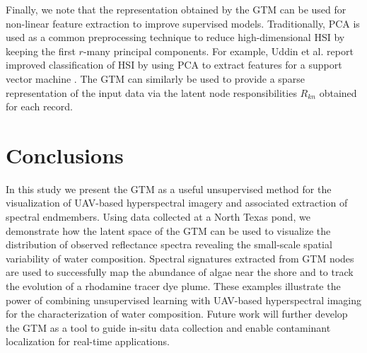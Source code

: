 \documentclass[remotesensing,article,submit,pdftex,moreauthors]{Definitions/mdpi}
\begin{document}
Finally, we note that the representation obtained by the GTM can be used for non-linear feature extraction to improve supervised models. Traditionally, PCA is used as a common preprocessing technique to reduce high-dimensional HSI by keeping the first $r$-many principal components. For example, Uddin et al. report improved classification of HSI by using PCA to extract features for a support vector machine \cite{uddin2021pca}. The GTM can similarly be used to provide a sparse representation of the input data via the latent node responsibilities $R_{kn}$ obtained for each record. 

\section{Conclusions}\label{conclusions}

In this study we present the GTM as a useful unsupervised method for the visualization of UAV-based hyperspectral imagery and associated extraction of spectral endmembers. Using data collected at a North Texas pond, we demonstrate how the latent space of the GTM can be used to visualize the distribution of observed reflectance spectra revealing the small-scale spatial variability of water composition. Spectral signatures extracted from GTM nodes are used to successfully map the abundance of algae near the shore and to track the evolution of a rhodamine tracer dye plume. These examples illustrate the power of combining unsupervised learning with UAV-based hyperspectral imaging for the characterization of water composition. Future work will further develop the GTM as a tool to guide in-situ data collection and enable contaminant localization for real-time applications.



\vspace{6pt} 


\end{document}
